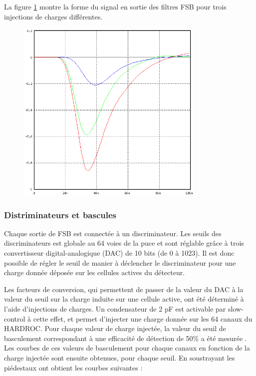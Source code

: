 La figure \ref{signal} montre la forme du signal en sortie des filtres FSB pour trois injections de charges différentes.
\begin{figure}[ht!]
	\centering
	\includegraphics[width=0.8\textwidth]{GLA/SIGNAL.png}
	\label{signal}
\end{figure}

\subsubsection{Distriminateurs et bascules}
Chaque sortie de FSB est connectée à un discriminateur. Les seuils des discriminateurs est globale au 64 voies de la puce et sont réglable grâce à trois convertisseur digital-analogique (DAC) de 10 bits (de 0 à 1023). Il est donc possible de régler le seuil de manier à déclencher le discriminateur pour une charge donnée déposée sur les cellules actives du détecteur.

Les facteurs de conversion, qui permettent de passer de la valeur du DAC à la valeur du seuil sur la charge induite sur une cellule active, ont été déterminé à l'aide d'injections de charges. Un condensateur de 2 pF est activable par slow-control à cette effet, et permet d'injecter une charge donnée sur les 64 canaux du HARDROC. Pour chaque valeur de charge injectée, la valeur du seuil de basculement correspondant à une efficacité de détection de 50\% a été mesurée \cite{kieffer:tel-00751999}. Les courbes de ces valeurs de basculement pour chaque canaux en fonction de la charge injectée sont ensuite obtenues, pour chaque seuil. En soustrayant les piédestaux ont obtient les courbes suivantes :

